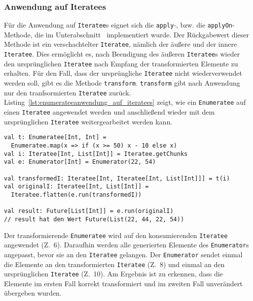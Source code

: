 

\subsubsection{Anwendung auf Iteratees} %
\label{ssub:enumerateeanwendung_auf_iteratees}

Für die Anwendung auf \lstinline|Iteratee|s eignet sich die \lstinline|apply|-, bzw. die \lstinline|applyOn|-Methode, die im Unterabschnitt~ implementiert wurde.
Der Rückgabewert dieser Methode ist ein verschachtelter \lstinline|Iteratee|, nämlich der äußere und der innere \lstinline|Iteratee|.
Dies ermöglicht es, nach Beendigung des äußeren \lstinline|Iteratee|s wieder den ursprünglichen \lstinline|Iteratee| nach Empfang der transformierten Elemente zu erhalten.
Für den Fall, dass der ursprüngliche \lstinline|Iteratee| nicht wiederverwendet werden soll, gibt es die Methode \lstinline|transform|.
\lstinline|transform| gibt nach Anwendung nur den tranfsormierten \lstinline|Iteratee| zurück.
Listing~\ref{lst:enumerateeanwendung_auf_iteratees} zeigt, wie ein \lstinline|Enumeratee| auf einen \lstinline|Iteratee| angewendet werden und anschließend wieder mit dem ursprünglichen \lstinline|Iteratee| weitergearbeitet werden kann.

\begin{lstlisting}[caption=Enumerateeanwendung auf Iteratees, label=lst:enumerateeanwendung_auf_iteratees]
val t: Enumeratee[Int, Int] =
  Enumeratee.map(x => if (x >= 50) x - 10 else x)
val i: Iteratee[Int, List[Int]] = Iteratee.getChunks
val e: Enumerator[Int] = Enumerator(22, 54)

val transformedI: Iteratee[Int, Iteratee[Int, List[Int]]] = t(i)
val originalI: Iteratee[Int, List[Int]] =
  Iteratee.flatten(e.run(transformedI))

val result: Future[List[Int]] = e.run(originalI)
// result hat den Wert Future(List(22, 44, 22, 54))
\end{lstlisting}

Der transformierende \lstinline|Enumeratee| wird auf den konsumierenden \lstinline|Iteratee| angewendet (Z.~6).
Daraufhin werden alle generierten Elemente des \lstinline|Enumerator|s angepasst, bevor sie an den \lstinline|Iteratee| gelangen.
Der \lstinline|Enumerator| sendet einmal die Elemente an den transformierten \lstinline|Iteratee| (Z.~8) und einmal an den ursprünglichen \lstinline|Iteratee| (Z.~10).
Am Ergebnis ist zu erkennen, dass die Elemente im ersten Fall korrekt transformiert und im zweiten Fall unverändert übergeben wurden.

